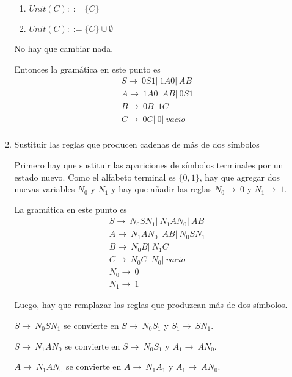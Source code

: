 \documentclass{article}
\begin{document}
\begin{enumerate}
\begin{enumerate}
        \begin{enumerate}
            \item $Unit(C) ::= \{C\}$
            \item $Unit(C) ::= \{C\} \cup \emptyset$
        \end{enumerate}
        No hay que cambiar nada.

        Entonces la gramática en este punto es 
        \begin{align*}
            &S \rightarrow \ 0S1 |\ 1A0 |\ AB \\
            &A \rightarrow \ 1A0 | \ AB | \ 0S1\\
            &B \rightarrow \ 0B |\ 1C \\
            &C \rightarrow \ 0C |\ 0 |\ vacio \\
        \end{align*}

        \item Sustituir las reglas que producen cadenas de más de dos símbolos
        
        Primero hay que sustituir las apariciones de símbolos terminales por un
        estado nuevo. Como el alfabeto terminal es $\{0, 1\}$, hay que agregar 
        dos nuevas variables $N_0$ y $N_1$ y hay que añadir las reglas $N_0 \rightarrow \ 0 $ y $N_1 \rightarrow \ 1$.

        La gramática en este punto es
        \begin{align*}
            &S \rightarrow \ N_0SN_1 |\ N_1AN_0 |\ AB \\
            &A \rightarrow \ N_1AN_0 | \ AB |\ N_0SN_1 \\
            &B \rightarrow \ N_0B |\ N_1C \\
            &C \rightarrow \ N_0C |\ N_0 |\ vacio \\
            &N_0 \rightarrow \ 0 \\
            &N_1 \rightarrow \ 1
        \end{align*}

        Luego, hay que remplazar las reglas que produzcan más de dos símbolos.

        $S \rightarrow \ N_0SN_1$ se convierte en $S \rightarrow \ N_0S_1$ y 
        $S_1 \rightarrow \ SN_1$.

        $S \rightarrow \ N_1AN_0$ se convierte en $S \rightarrow \ N_0S_1$ y 
        $A_1 \rightarrow \ AN_0$.

        $A \rightarrow \ N_1AN_0$ se convierte en $A \rightarrow \ N_1A_1$ y 
        $A_1 \rightarrow \ AN_0$.


\end{enumerate}
\end{enumerate}
\end{document}
